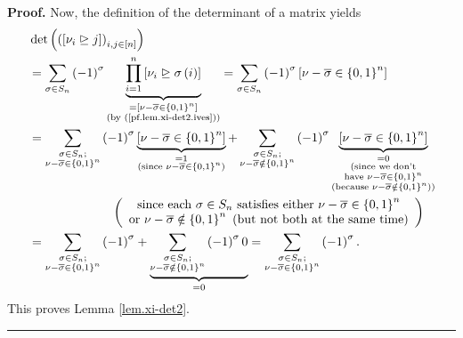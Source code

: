 \documentclass[numbers=enddot,12pt,final,onecolumn,notitlepage,english]{scrartcl}%
\theoremstyle{definition}
\newenvironment{proof}[1][Proof]{\noindent\textbf{#1.} }{\ \rule{0.5em}{0.5em}}
\let\sumnonlimits\sum
\let\prodnonlimits\prod
\renewcommand{\sum}{\sumnonlimits\limits}
\renewcommand{\prod}{\prodnonlimits\limits}
\newenvironment{verlong}{}{}
\begin{document}
\begin{verlong}
\begin{proof}
Now, the definition of the determinant of a matrix yields%
\begin{align*}
&  \det\left(  \left(  \left[  \nu_{i}\trianglerighteq j\right]  \right)
_{i,j\in\left[  n\right]  }\right) \\
&  =\sum_{\sigma\in S_{n}}\left(  -1\right)  ^{\sigma}\underbrace{\prod
_{i=1}^{n}\left[  \nu_{i}\trianglerighteq\sigma\left(  i\right)  \right]
}_{\substack{=\left[  \nu-\overline{\sigma}\in\left\{  0,1\right\}
^{n}\right]  \\\text{(by (\ref{pf.lem.xi-det2.ives}))}}}=\sum_{\sigma\in
S_{n}}\left(  -1\right)  ^{\sigma}\left[  \nu-\overline{\sigma}\in\left\{
0,1\right\}  ^{n}\right] \\
&  =\sum_{\substack{\sigma\in S_{n};\\\nu-\overline{\sigma}\in\left\{
0,1\right\}  ^{n}}}\left(  -1\right)  ^{\sigma}\underbrace{\left[
\nu-\overline{\sigma}\in\left\{  0,1\right\}  ^{n}\right]  }%
_{\substack{=1\\\text{(since }\nu-\overline{\sigma}\in\left\{  0,1\right\}
^{n}\text{)}}}+\sum_{\substack{\sigma\in S_{n};\\\nu-\overline{\sigma}%
\notin\left\{  0,1\right\}  ^{n}}}\left(  -1\right)  ^{\sigma}%
\underbrace{\left[  \nu-\overline{\sigma}\in\left\{  0,1\right\}  ^{n}\right]
}_{\substack{=0\\\text{(since we don't}\\\text{have }\nu-\overline{\sigma}%
\in\left\{  0,1\right\}  ^{n}\\\text{(because }\nu-\overline{\sigma}%
\notin\left\{  0,1\right\}  ^{n}\text{))}}}\\
&  \ \ \ \ \ \ \ \ \ \ \ \ \ \ \ \ \ \ \ \ \left(
\begin{array}
[c]{c}%
\text{since each }\sigma\in S_{n}\text{ satisfies either }\nu-\overline
{\sigma}\in\left\{  0,1\right\}  ^{n}\\
\text{or }\nu-\overline{\sigma}\notin\left\{  0,1\right\}  ^{n}\text{ (but not
both at the same time)}%
\end{array}
\right) \\
&  =\sum_{\substack{\sigma\in S_{n};\\\nu-\overline{\sigma}\in\left\{
0,1\right\}  ^{n}}}\left(  -1\right)  ^{\sigma}+\underbrace{\sum
_{\substack{\sigma\in S_{n};\\\nu-\overline{\sigma}\notin\left\{  0,1\right\}
^{n}}}\left(  -1\right)  ^{\sigma}0}_{=0}=\sum_{\substack{\sigma\in
S_{n};\\\nu-\overline{\sigma}\in\left\{  0,1\right\}  ^{n}}}\left(  -1\right)
^{\sigma}.
\end{align*}
This proves Lemma \ref{lem.xi-det2}.
\end{proof}
\end{verlong}
\end{document}

